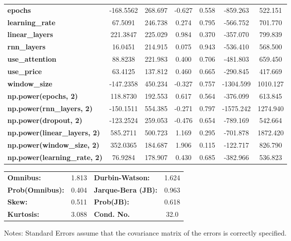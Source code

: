 \begin{center}
\begin{tabular}{lcccccc}
\textbf{epochs}                            &    -168.5562  &      268.697     &    -0.627  &         0.558        &     -859.263    &      522.151     \\
\textbf{learning\_rate}                    &      67.5091  &      246.738     &     0.274  &         0.795        &     -566.752    &      701.770     \\
\textbf{linear\_layers}                    &     221.3847  &      225.029     &     0.984  &         0.370        &     -357.070    &      799.839     \\
\textbf{rnn\_layers}                       &      16.0451  &      214.915     &     0.075  &         0.943        &     -536.410    &      568.500     \\
\textbf{use\_attention}                    &      88.8238  &      221.983     &     0.400  &         0.706        &     -481.803    &      659.450     \\
\textbf{use\_price}                        &      63.4125  &      137.812     &     0.460  &         0.665        &     -290.845    &      417.669     \\
\textbf{window\_size}                      &    -147.2358  &      450.234     &    -0.327  &         0.757        &    -1304.599    &     1010.127     \\
\textbf{np.power(epochs, 2)}               &     118.8730  &      192.553     &     0.617  &         0.564        &     -376.099    &      613.845     \\
\textbf{np.power(rnn\_layers, 2)}          &    -150.1511  &      554.385     &    -0.271  &         0.797        &    -1575.242    &     1274.940     \\
\textbf{np.power(dropout, 2)}              &    -123.2524  &      259.053     &    -0.476  &         0.654        &     -789.169    &      542.664     \\
\textbf{np.power(linear\_layers, 2)}       &     585.2711  &      500.723     &     1.169  &         0.295        &     -701.878    &     1872.420     \\
\textbf{np.power(window\_size, 2)}         &     352.0365  &      184.687     &     1.906  &         0.115        &     -122.717    &      826.790     \\
\textbf{np.power(learning\_rate, 2)}       &      76.9284  &      178.907     &     0.430  &         0.685        &     -382.966    &      536.823     \\
\bottomrule
\end{tabular}
\begin{tabular}{lclc}
\textbf{Omnibus:}       &  1.813 & \textbf{  Durbin-Watson:     } &    1.624  \\
\textbf{Prob(Omnibus):} &  0.404 & \textbf{  Jarque-Bera (JB):  } &    0.963  \\
\textbf{Skew:}          &  0.511 & \textbf{  Prob(JB):          } &    0.618  \\
\textbf{Kurtosis:}      &  3.088 & \textbf{  Cond. No.          } &     32.0  \\
\bottomrule
\end{tabular}
\end{center}

Notes: \newline
 [1] Standard Errors assume that the covariance matrix of the errors is correctly specified.